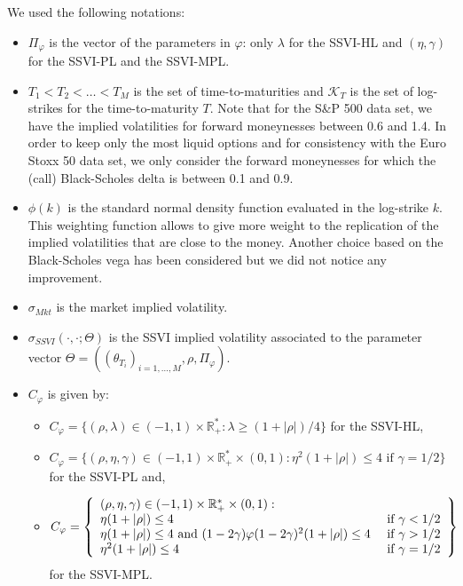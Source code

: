 We used the following notations:
\begin{itemize}
    \item $\Pi_{\varphi}$ is the vector of the parameters in $\varphi$: only $\lambda$ for the SSVI-HL and $(\eta,\gamma)$ for the SSVI-PL and the SSVI-MPL. 
    \item $T_1<T_2<\dots < T_M$ is the set of time-to-maturities and $\mathcal{K}_T$ is the set of log-strikes for the time-to-maturity $T$. Note that for the S\&P 500 data set, we have the implied volatilities for forward moneynesses between 0.6 and 1.4. In order to keep only the most liquid options and for consistency with the Euro Stoxx 50 data set, we only consider the forward moneynesses for which the (call) Black-Scholes delta is between 0.1 and 0.9.
    \item $\phi(k)$ is the standard normal density function evaluated in the log-strike $k$. This weighting function allows to give more weight to the replication of the implied volatilities that are close to the money. Another choice based on the Black-Scholes vega has been considered but we did not notice any improvement.
    \item $\sigma_{Mkt}$ is the market implied volatility. 
    \item  $\sigma_{SSVI}(\cdot,\cdot;\Theta)$ is the SSVI implied volatility associated to the parameter vector $\Theta=((\theta_{T_i})_{i=1,\dots,M},\rho,\Pi_{\varphi})$.
    \item $C_{\varphi}$ is given by: 
    \begin{itemize}
        \item[--]  $C_{\varphi} = \{ (\rho,\lambda) \in (-1,1)\times \mathbb{R}_+^* : \lambda \ge (1+|\rho|)/4 \}$ for the SSVI-HL,
        \item[--]  $C_{\varphi} = \{(\rho,\eta,\gamma) \in (-1,1)\times \mathbb{R}_+^*\times (0,1) : \eta^2(1+|\rho|) \le 4 \text{ if } \gamma = 1/2 \}$ for the SSVI-PL and,
        \item[--] \begin{equation*}
            C_{\varphi} = \left\{
            \begin{array}{ll}
                \multicolumn{2}{l}{(\rho,\eta,\gamma)\in(-1,1)\times \mathbb{R}_+^*\times (0,1) :} \\
                \eta (1+|\rho|) \le 4 & \text{ if } \gamma < 1/2 \\
                \eta (1+|\rho|) \le 4 \text{ and } (1-2\gamma)\varphi(1-2\gamma)^2(1+|\rho|)\le 4 & \text{ if } \gamma >1/2 \\
                \eta^2(1+|\rho|) \le 4 & \text{ if } \gamma = 1/2 
            \end{array}
            \right\}
        \end{equation*}
        for the SSVI-MPL. 
    \end{itemize}
\end{itemize}
